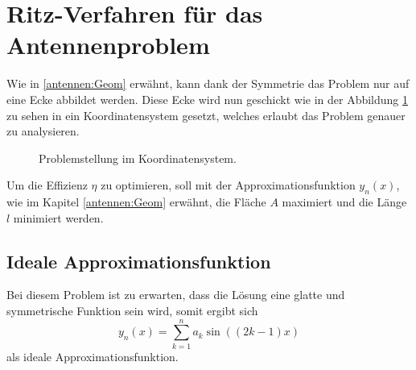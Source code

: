 %
%
% 
%
%

\usetikzlibrary{pgfplots.fillbetween}

\section{Ritz-Verfahren für das Antennenproblem\label{antennen:ritzAnw}}

Wie in \ref{antennen:Geom} erwähnt, kann dank der Symmetrie das Problem nur auf eine Ecke abbildet werden. 
Diese Ecke wird nun geschickt wie in der Abbildung \ref{antennen:koordSysBsp} zu sehen 
in ein Koordinatensystem gesetzt, welches erlaubt das Problem genauer zu analysieren.
\begin{figure}
	\centering
	\caption{Problemstellung im Koordinatensystem.}
	\label{antennen:koordSysBsp}
\end{figure}

Um die Effizienz $\eta$ zu optimieren, soll mit der Approximationsfunktion
$y_n(x)$, wie im Kapitel \ref{antennen:Geom} erwähnt, die Fläche $A$ 
maximiert und die Länge $l$ minimiert werden.

\subsection{Ideale Approximationsfunktion\label{antennen:unsereApproxFunkt}}

Bei diesem Problem ist zu erwarten, dass die Lösung eine glatte und symmetrische
Funktion sein wird, somit ergibt sich
\begin{equation}
	y_n(x)
	= 
	\sum_{k=1}^n a_k\sin((2k-1)x)
	\label{antennen:unserRitz}
\end{equation}
als ideale Approximationsfunktion. 

